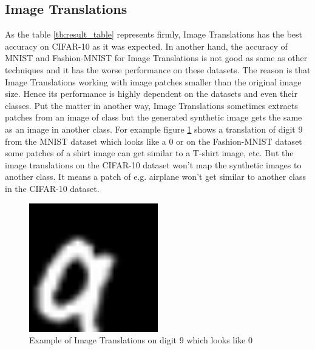 \subsection{Image Translations}
As the table \ref{tb:result_table} represents firmly, Image Translations has the best accuracy on CIFAR-10 as it
was expected. In another hand, the accuracy of MNIST and Fashion-MNIST for Image Translations is not
good as same as other techniques and it has the worse performance on these datasets. The reason is
that Image Translations working with image patches smaller than the original image size. Hence its
performance is highly dependent on the datasets and even their classes. Put the matter in another
way, Image Translations sometimes extracts patches from an image of class but the generated synthetic
image gets the same as an image in another class. For example figure \ref{fig:image_translation_example_bad_accuracy} shows a translation of
digit $9$ from the MNIST dataset which looks like a $0$ or on the Fashion-MNIST dataset some patches
of a shirt image can get similar to a T-shirt image, etc. But the image translations on the CIFAR-10
dataset won't map the synthetic images to another class. It means a patch of e.g. airplane won't get
similar to another class in the CIFAR-10 dataset.
\begin{figure}
  \centering
  \label{fig:image_translation_example_bad_accuracy}
  \includegraphics[width=0.5\textwidth]{fig/result/Image_translations_mnist}
  \caption{Example of Image Translations on digit $9$ which looks like $0$}
\end{figure}

